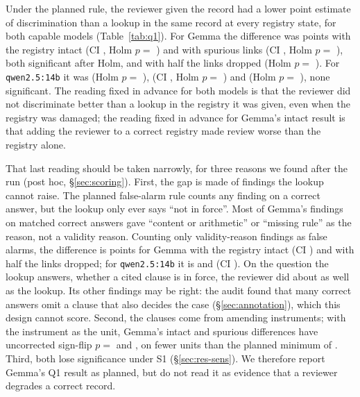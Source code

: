 Under the planned rule, the reviewer given the record had a lower point estimate of discrimination than a lookup
in the same record at every registry state, for both capable models (Table~\ref{tab:q1}). For Gemma the difference
was \DiffNetIntactGemma{} points with the registry intact (CI \CINetIntactGemma, Holm $p=$ \PHolmNetIntactGemma) and
\DiffNetSpuriousTenGemma{} with spurious links (CI \CINetSpuriousTenGemma, Holm $p=$ \PHolmNetSpuriousTenGemma),
both significant after Holm, and \DiffNetDropFiftyGemma{} with half the links dropped (Holm $p=$
\PHolmNetDropFiftyGemma). For \texttt{qwen2.5:14b} it was \DiffNetIntactQwenFourteen{} (Holm $p=$
\PHolmNetIntactQwenFourteen), \DiffNetDropFiftyQwenFourteen{} (CI \CINetDropFiftyQwenFourteen, Holm $p=$
\PHolmNetDropFiftyQwenFourteen) and \DiffNetSpuriousTenQwenFourteen{} (Holm $p=$ \PHolmNetSpuriousTenQwenFourteen),
none significant. The reading fixed in advance for both models is that the reviewer did not discriminate better than a
lookup in the registry it was given, even when the registry was damaged; the reading fixed in advance for Gemma's intact
result is that adding the reviewer to a correct registry made review worse than the registry alone.

That last reading should be taken narrowly, for three reasons we found after the run (post hoc, \S\ref{sec:scoring}).
First, the gap is made of findings the lookup cannot raise. The planned false-alarm rule counts any finding on a
correct answer, but the lookup only ever says ``not in force''. Most of Gemma's findings on matched correct answers gave
``content or arithmetic'' or ``missing rule'' as the reason, not a validity reason. Counting only validity-reason
findings as false alarms, the difference is \DiffNetVIntactGemma{} points for Gemma with the registry intact (CI
\CINetVIntactGemma) and \DiffNetVDropFiftyGemma{} with half the links dropped; for \texttt{qwen2.5:14b} it is
\DiffNetVIntactQwenFourteen{} and \DiffNetVDropFiftyQwenFourteen{} (CI \CINetVDropFiftyQwenFourteen). On the
question the lookup answers, whether a cited clause is in force, the reviewer did about as well as the lookup. Its
other findings may be right: the audit found that many correct answers omit a clause that also decides the case
(\S\ref{sec:annotation}), which this design cannot score. Second, the \NClauses{} clauses come from
\InstrNIntactGemma{} amending instruments; with the instrument as the unit, Gemma's intact and spurious differences
have uncorrected sign-flip $p=$ \InstrPIntactGemma{} and \InstrPSpuriousTenGemma, on fewer units than the planned
minimum of \MinClauses. Third, both lose significance under S1 (\S\ref{sec:res-sens}). We therefore report Gemma's
Q1 result as planned, but do not read it as evidence that a reviewer degrades a correct record.

